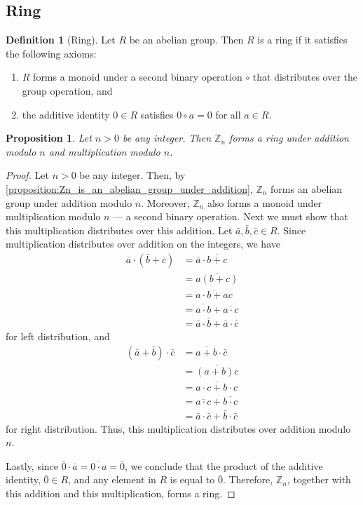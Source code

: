 \documentclass[12pt, titlepage]{amsart}
\newcommand\Z{{\mathbb Z}}
\newtheorem{prop}{Proposition}[subsection]
\theoremstyle{definition}
\newtheorem{definition}{Definition}[subsection]
\begin{document}
	\subsection{Ring}
	
	\begin{definition}[Ring]\label{definition:ring}
		Let $R$ be an abelian group.
		Then $R$ is a ring if it satisfies the following axioms:
		\begin{enumerate}
			\item $R$ forms a monoid under a second binary operation $\circ$ that distributes over the group operation, and 
			\item the additive identity $0 \in R$ satisfies $0 \circ a = 0$ for all $a \in R$.
		\end{enumerate}
	\end{definition}
	
	\begin{prop}\label{proposition:Zn_is_a_ring}
		Let $n > 0$ be any integer. Then $\Z_n$ forms a ring under addition modulo $n$ and multiplication modulo $n$.
	\end{prop}
	
	\begin{proof}
		Let $n > 0$ be any integer.
		Then, by \cref{proposition:Zn_is_an_abelian_group_under_addition}, $\Z_n$ forms an abelian group under addition modulo $n$.
		Moreover, $\Z_n$ also forms a monoid under multiplication modulo $n$ --- a second binary operation.
		Next we must show that this multiplication distributes over this addition.
		Let $\bar{a}, \bar{b}, \bar{c} \in R$.
		Since multiplication distributes over addition on the integers, we have	
		\begin{align*}
			\bar{a} \cdot (\bar{b}+\bar{c}) 
			&= \bar{a} \cdot \overline{b+c} \\
			&= \overline{a (b+c)} \\
			&= \overline{a \cdot b+ac} \\
			&= \overline{a \cdot b} + \overline{a \cdot c} \\
			&= \bar{a} \cdot \bar{b} + \bar{a} \cdot \bar{c}
		\end{align*}
		for left distribution, and 
		\begin{align*}
			(\bar{a}+\bar{b}) \cdot \bar{c} 
			&= \overline{a + b} \cdot \bar{c} \\
			&= \overline{(a + b)c} \\
			&= \overline{a \cdot c + b \cdot c} \\
			&= \overline{a \cdot c} + \overline{b \cdot c} \\
			&= \bar{a} \cdot \bar{c} + \bar{b} \cdot \bar{c}
		\end{align*}
		for right distribution.
		Thus, this multiplication distributes over addition modulo $n$.
		
		Lastly, since $\bar{0} \cdot \bar{a} = \overline{0 \cdot a} = \bar{0}$, we conclude that the product of the additive identity, $\bar{0} \in R$, and any element in $R$ is equal to $\bar{0}$. Therefore, $\Z_n$, together with this addition and this multiplication, forms a ring.	
	\end{proof}
	
\end{document}

